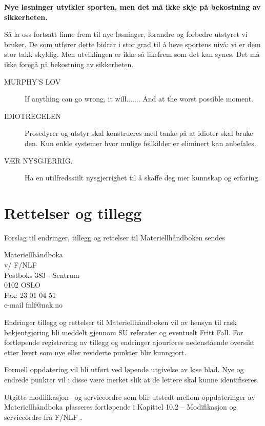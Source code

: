 \textbf{Nye løsninger utvikler sporten, men det må ikke skje på bekostning av sikkerheten.}

Så la oss fortsatt finne frem til nye løsninger, forandre og forbedre utstyret vi bruker. De som utfører dette bidrar i stor grad til å heve sportens nivå: vi er dem stor takk skyldig. Men utviklingen er ikke så likefrem som det kan synes. Det må ikke foregå på bekostning av sikkerheten.
\begin{description}
	\item[MURPHY'S LOV] If anything can go wrong, it will....... And at the worst possible moment.
	\item[IDIOTREGELEN] Prosedyrer og utstyr skal konstrueres med tanke på at idioter skal bruke den. Kun enkle systemer hvor mulige feilkilder er eliminert kan anbefales.
	\item[VÆR NYSGJERRIG.] Ha en utilfredsstilt nysgjerrighet til å skaffe deg mer kunnskap og erfaring.
\end{description}

\section{Rettelser og tillegg}
Forslag til endringer, tillegg og rettelser til Materiellhåndboken sendes

Materiellhåndboka \\
v/ F/NLF \\
Postboks 383 - Sentrum \\
0102 OSLO \\

Fax: 23 01 04 51 \\
e-mail fnlf@nak.no

Endringer tillegg og rettelser til Materiellhåndboken vil av hensyn til rask bekjentgjøring bli meddelt gjennom SU referater og eventuelt Fritt Fall. For fortløpende registrering av tillegg og endringer ajourføres nedenstående oversikt etter hvert som nye eller reviderte punkter blir kunngjort.

Formell oppdatering vil bli utført ved løpende utgivelse av løse blad. Nye og endrede punkter vil i disse være merket slik at de lettere skal kunne identifiseres.

Utgitte modifikasjon– og serviceordre som blir utstedt mellom oppdateringer av Materiellhåndboka plasseres fortløpende i Kapittel 10.2 – Modifikasjon og serviceordre fra F/NLF .
